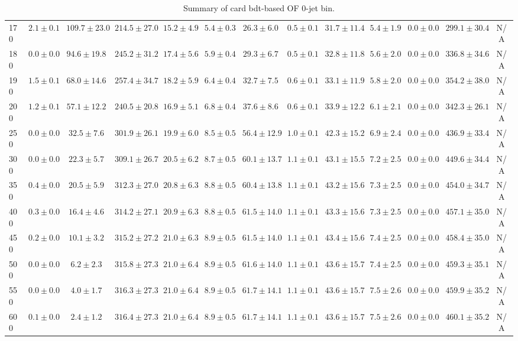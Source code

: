 \begin{table}
{\begin{center}
\begin{tabular}{l | c c | c c c c c c c c  | c c}
170 & $2.1\pm0.1$ & $109.7\pm23.0$ & $214.5\pm27.0$ & $15.2\pm4.9$ & $5.4\pm0.3$ & $26.3\pm6.0$ & $0.5\pm0.1$ & $31.7\pm11.4$ & $5.4\pm1.9$ & $0.0\pm0.0$ & $299.1\pm30.4$ & N/A \\
180 & $0.0\pm0.0$ & $94.6\pm19.8$ & $245.2\pm31.2$ & $17.4\pm5.6$ & $5.9\pm0.4$ & $29.3\pm6.7$ & $0.5\pm0.1$ & $32.8\pm11.8$ & $5.6\pm2.0$ & $0.0\pm0.0$ & $336.8\pm34.6$ & N/A \\
190 & $1.5\pm0.1$ & $68.0\pm14.6$ & $257.4\pm34.7$ & $18.2\pm5.9$ & $6.4\pm0.4$ & $32.7\pm7.5$ & $0.6\pm0.1$ & $33.1\pm11.9$ & $5.8\pm2.0$ & $0.0\pm0.0$ & $354.2\pm38.0$ & N/A \\
200 & $1.2\pm0.1$ & $57.1\pm12.2$ & $240.5\pm20.8$ & $16.9\pm5.1$ & $6.8\pm0.4$ & $37.6\pm8.6$ & $0.6\pm0.1$ & $33.9\pm12.2$ & $6.1\pm2.1$ & $0.0\pm0.0$ & $342.3\pm26.1$ & N/A \\
250 & $0.0\pm0.0$ & $32.5\pm7.6$ & $301.9\pm26.1$ & $19.9\pm6.0$ & $8.5\pm0.5$ & $56.4\pm12.9$ & $1.0\pm0.1$ & $42.3\pm15.2$ & $6.9\pm2.4$ & $0.0\pm0.0$ & $436.9\pm33.4$ & N/A \\
300 & $0.0\pm0.0$ & $22.3\pm5.7$ & $309.1\pm26.7$ & $20.5\pm6.2$ & $8.7\pm0.5$ & $60.1\pm13.7$ & $1.1\pm0.1$ & $43.1\pm15.5$ & $7.2\pm2.5$ & $0.0\pm0.0$ & $449.6\pm34.4$ & N/A \\
350 & $0.4\pm0.0$ & $20.5\pm5.9$ & $312.3\pm27.0$ & $20.8\pm6.3$ & $8.8\pm0.5$ & $60.4\pm13.8$ & $1.1\pm0.1$ & $43.2\pm15.6$ & $7.3\pm2.5$ & $0.0\pm0.0$ & $454.0\pm34.7$ & N/A \\
400 & $0.3\pm0.0$ & $16.4\pm4.6$ & $314.2\pm27.1$ & $20.9\pm6.3$ & $8.8\pm0.5$ & $61.5\pm14.0$ & $1.1\pm0.1$ & $43.3\pm15.6$ & $7.3\pm2.5$ & $0.0\pm0.0$ & $457.1\pm35.0$ & N/A \\
450 & $0.2\pm0.0$ & $10.1\pm3.2$ & $315.2\pm27.2$ & $21.0\pm6.3$ & $8.9\pm0.5$ & $61.5\pm14.0$ & $1.1\pm0.1$ & $43.4\pm15.6$ & $7.4\pm2.5$ & $0.0\pm0.0$ & $458.4\pm35.0$ & N/A \\
500 & $0.0\pm0.0$ & $6.2\pm2.3$ & $315.8\pm27.3$ & $21.0\pm6.4$ & $8.9\pm0.5$ & $61.6\pm14.0$ & $1.1\pm0.1$ & $43.6\pm15.7$ & $7.4\pm2.5$ & $0.0\pm0.0$ & $459.3\pm35.1$ & N/A \\
550 & $0.0\pm0.0$ & $4.0\pm1.7$ & $316.3\pm27.3$ & $21.0\pm6.4$ & $8.9\pm0.5$ & $61.7\pm14.1$ & $1.1\pm0.1$ & $43.6\pm15.7$ & $7.5\pm2.6$ & $0.0\pm0.0$ & $459.9\pm35.2$ & N/A \\
600 & $0.1\pm0.0$ & $2.4\pm1.2$ & $316.4\pm27.3$ & $21.0\pm6.4$ & $8.9\pm0.5$ & $61.7\pm14.1$ & $1.1\pm0.1$ & $43.6\pm15.7$ & $7.5\pm2.6$ & $0.0\pm0.0$ & $460.1\pm35.2$ & N/A \\
\hline
\end{tabular}
\end{center}
}
\caption{Summary of card bdt-based OF 0-jet bin.}
\end{table}
